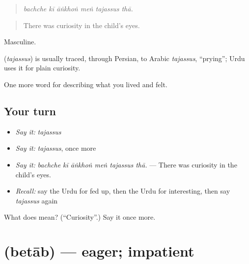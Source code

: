 \begin{quote}
     
\end{quote}

\begin{quote}
\emph{bachche kī āṅkhoṅ meṅ tajassus thā.}
\end{quote}

\begin{quote}
There was curiosity in the child's eyes.
\end{quote}

Masculine.

\begin{cousinweb}
\textbf{} (\emph{tajassus}) is usually traced, through Persian, to Arabic \emph{tajassus}, \textquotedblleft{}prying\textquotedblright{}; Urdu uses it for plain curiosity.
\end{cousinweb}

\begin{grammarlens}[title={What you've built}]
One more word for describing what you lived and felt.
\end{grammarlens}

\subsection*{Your turn}
\begin{itemize}
\raggedright
  \item \emph{Say it:} \emph{tajassus}
  \item \emph{Say it:} \emph{tajassus}, once more
  \item \emph{Say it:} \emph{bachche kī āṅkhoṅ meṅ tajassus thā.} — There was curiosity in the child's eyes.
  \item \emph{Recall:} say the Urdu for fed up, then the Urdu for interesting, then say \emph{tajassus} again
\end{itemize}

\begin{tcolorbox}[breakable,colback=teal!4,colframe=teal!35!black,title={Before you move on}]
What does  mean? (\textquotedblleft{}Curiosity\textquotedblright{}.) Say it once more.
\end{tcolorbox}
\section[\texorpdfstring{\ur{بیتاب} (betāb)}{بیتاب (betāb)}]{ (betāb) — eager; impatient}


